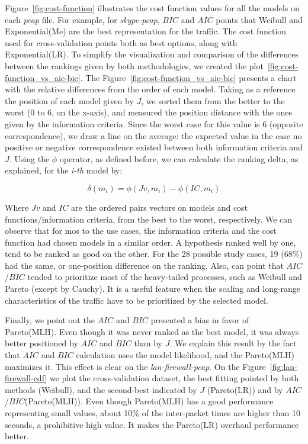 Figure~\ref{fig:cost-function} illustrates the cost function values for all the models on each \textit{pcap} file. For example, for \textit{skype-pcap}, $BIC$ and $AIC$ points that  Weibull and Exponential(Me) are the best representation for the traffic. The cost function used for cross-validation points both as best options, along with Exponential(LR).  To simplify the visualization and comparison of the differences between the rankings given by both methodologies, we created the plot~\ref{fig:cost-function_vs_aic-bic}.
The Figure~\ref{fig:cost-function_vs_aic-bic} presents a chart with the relative differences from the order of each model. Taking as a reference the position of each model given by $J$, we sorted them from the better to the worst (0 to 6, on the x-axis), and measured the position distance with the ones given by the information criteria. Since the worst case for this value is 6 (opposite correspondence), we draw a line on the average: the expected value in the case no positive or negative correspondence existed between both information criteria and $J$. Using the $\phi$ operator, as defined before, we can calculate the ranking delta, as explained, for the \textit{i-th} model by:

\begin{equation}
\delta(m_i) = \phi(Jv, m_i) - \phi(IC, m_i)
\end{equation}

Where $Jv$ and $IC$ are the ordered pairs vectors on models and cost functions/information criteria, from the best to the worst, respectively.  We can observe that for mos to the use cases, the information criteria and the cost function had chosen models in a similar order. A hypothesis ranked well by one, tend to be ranked as good on the other. For the 28 possible study cases, 19 (68\%) had the same, or one-position difference on the ranking. 
Also, can point that $AIC$/$BIC$ tended to prioritize most of the heavy-tailed processes, such as Weibull and Pareto (except by Cauchy). It is a useful feature when the scaling and long-range characteristics of the traffic have to be prioritized by the selected model. 

Finally, we point out the $AIC$ and $BIC$ presented a bias in favor of Pareto(MLH). Even though it was never ranked as the best model, it was always better positioned by $AIC$ and $BIC$ than by $J$. We explain this result by the fact that $AIC$ and $BIC$ calculation uses the model likelihood, and the  Pareto(MLH) maximizes it.  This effect is clear on the \textit{lan-firewall-pcap}. On the Figure~\ref{fig:lan-firewall-cdf} we plot the cross-validation dataset, the best fitting pointed by both methods (Weibull), and the second-best indicated by $J$ (Pareto(LR)) and by $AIC$/$BIC$(Pareto(MLH)). Even though Pareto(MLH) has a good performance representing small values, about 10\% of the inter-packet times are higher than 10 seconds, a prohibitive high value. It makes the Pareto(LR) overhaul performance better.


